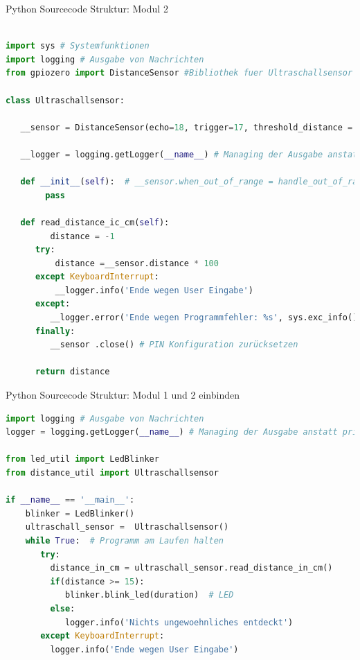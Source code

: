 \begin{frame}[fragile]{Python Sourcecode Struktur: Modul 2}
\begin{lstlisting}[language=Python]

import sys # Systemfunktionen
import logging # Ausgabe von Nachrichten
from gpiozero import DistanceSensor #Bibliothek fuer Ultraschallsensor

class Ultraschallsensor:
	 
   __sensor = DistanceSensor(echo=18, trigger=17, threshold_distance = 0.1, max_distance=1) #  Sensor Kontrolle für GPIO PIN  Input 17 und Output 18 an private Variable zuweisen
   
   __logger = logging.getLogger(__name__) # Managing der Ausgabe anstatt print() Funktion
   
   def __init__(self):  # __sensor.when_out_of_range = handle_out_of_range # Funktion, die z.B. loggt
        pass
   
   def read_distance_ic_cm(self):
         distance = -1
      try:
          distance =__sensor.distance * 100
      except KeyboardInterrupt:  
          __logger.info('Ende wegen User Eingabe')
      except:  
         __logger.error('Ende wegen Programmfehler: %s', sys.exc_info()[0]) # siehe https://docs.python.org/3/tutorial/errors.html
      finally:  
         __sensor .close() # PIN Konfiguration zurücksetzen
         
      return distance

\end{lstlisting}
\end{frame}

\begin{frame}[fragile]{Python Sourcecode Struktur: Modul 1  und 2 einbinden}
\begin{lstlisting}[language=Python]
import logging # Ausgabe von Nachrichten
logger = logging.getLogger(__name__) # Managing der Ausgabe anstatt print() Funktion

from led_util import LedBlinker
from distance_util import Ultraschallsensor

if __name__ == '__main__':
    blinker = LedBlinker()
    ultraschall_sensor =  Ultraschallsensor()
    while True:  # Programm am Laufen halten
       try:
         distance_in_cm = ultraschall_sensor.read_distance_in_cm()
         if(distance >= 15):
            blinker.blink_led(duration)  # LED
         else:
            logger.info('Nichts ungewoehnliches entdeckt') 
       except KeyboardInterrupt:  
         logger.info('Ende wegen User Eingabe')

\end{lstlisting}
\end{frame}




